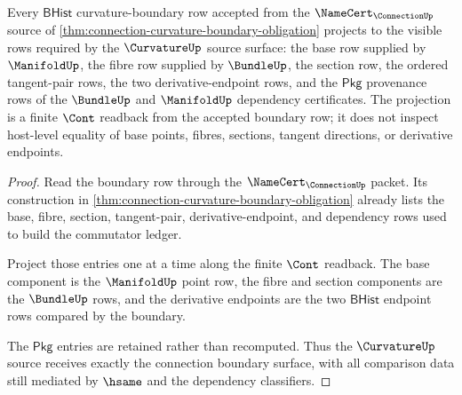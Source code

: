 \begin{theorem}
\label{thm:curvature-connection-boundary-source-projection}
Every $\mathsf{BHist}$ curvature-boundary row accepted from the $\NameCert_{\ConnectionUp}$ source of \autoref{thm:connection-curvature-boundary-obligation} projects to the visible rows required by the $\CurvatureUp$ source surface: the base row supplied by $\ManifoldUp$, the fibre row supplied by $\BundleUp$, the section row, the ordered tangent-pair rows, the two derivative-endpoint rows, and the $\mathsf{Pkg}$ provenance rows of the $\BundleUp$ and $\ManifoldUp$ dependency certificates. The projection is a finite $\Cont$ readback from the accepted boundary row; it does not inspect host-level equality of base points, fibres, sections, tangent directions, or derivative endpoints.
\end{theorem}
\begin{proof}
Read the boundary row through the $\NameCert_{\ConnectionUp}$ packet. Its construction in \autoref{thm:connection-curvature-boundary-obligation} already lists the base, fibre, section, tangent-pair, derivative-endpoint, and dependency rows used to build the commutator ledger.

Project those entries one at a time along the finite $\Cont$ readback. The base component is the $\ManifoldUp$ point row, the fibre and section components are the $\BundleUp$ rows, and the derivative endpoints are the two $\mathsf{BHist}$ endpoint rows compared by the boundary.

The $\mathsf{Pkg}$ entries are retained rather than recomputed. Thus the $\CurvatureUp$ source receives exactly the connection boundary surface, with all comparison data still mediated by $\hsame$ and the dependency classifiers.
\end{proof}


